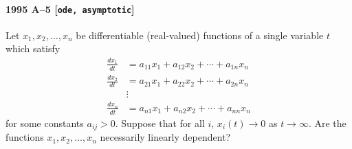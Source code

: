 \paragraph{1995 A--5 \textnormal{[\texttt{ode, asymptotic}]}}
Let $x_{1},x_{2},\dots,x_{n}$ be differentiable
(real-valued) functions of a single variable $t$ which satisfy
\begin{align*}
\frac{dx_{1}}{dt} &= a_{11}x_{1} + a_{12}x_{2} + \cdots + a_{1n}x_{n} \\
\frac{dx_{2}}{dt} &= a_{21}x_{1} + a_{22}x_{2} + \cdots + a_{2n}x_{n} \\
&\vdots \\
\frac{dx_{n}}{dt} &= a_{n1}x_{1} + a_{n2}x_{2} + \cdots + a_{nn}x_{n}
\end{align*}
for some constants $a_{ij}>0$. Suppose that for all $i$, $x_{i}(t)
\to 0$ as $t \to \infty$. Are the functions $x_{1},x_{2},\dots,x_{n}$
necessarily linearly dependent?
